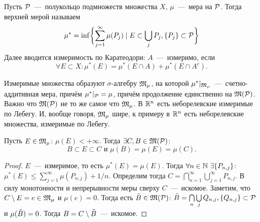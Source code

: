 \begin{reminder}
    Пусть $\mathcal{P}$~---~полукольцо подмножеств множества $X$, $\mu$~---~мера на $\mathcal{P}$. Тогда верхней мерой называем \[\mu^* = \inf \biggl\{\sum\limits_{j = 1}^\infty \mu(P_j) \mid E \subset \bigcup\limits_j P_j, \{P_j\} \subset \mathcal{P}\biggr\}\]
    Далее вводится измеримость по Каратеодори: $A$~---~измеримо, если \[\forall E \subset X: \mu^*(E) = \mu^*(E \cap A) + \mu^*(E \cap A^c).\]

    Измеримые множества образуют $\sigma$-алгебру $\mathfrak{M}_{\mu}$, на которой $\mu^* |_{\mathfrak{M}_{\mu}}$~---~счетно-аддитивная мера, причём $\mu^*|_{\mathcal{P}} = \mu$, причём продолжение единственно на $\mathfrak{M}(\mathcal{P})$. Важно что $\mathfrak{M}(\mathcal{P})$ не то же самое что  $\mathfrak{M}_{\mu}$. В $\mathbb{R}^n$ есть неборелевские измеримые по Лебегу. И, вообще говоря, $\mathfrak{M}_{\mu}$ шире, к примеру в $\mathbb{R}^n$ есть неборелевские множества, измеримые по Лебегу.
\end{reminder}
\begin{lemma}
    Пусть $E \in \mathfrak{M}_\mu$: $\mu (E) < +\infty$. Тогда $\exists C, B \in \mathfrak{M}(\mathcal{P})$: $$B \subset E \subset C \text{  и  } \mu(B) = \mu(E) = \mu(C).$$
\end{lemma}
\begin{proof}
    $E$~---~измеримое, то есть $\mu^*(E) = \mu(E)$.
    Тогда $\forall n \in \mathbb{N} \ \exists \{P_{n, j}\}$: $\mu^*(E) \leq \sum\limits_{j = 1}^\infty \mu(P_{n, j}) + 1/n$. Определим тогда $C = \bigcap\limits_{n = 1}^\infty\bigcup\limits_{j = 1}^\infty P_{n, j}$. В силу монотонности и непрерывности меры сверху $C$~---~искомое. Заметим, что $C \setminus E = e \in \mathfrak{M}_\mu$ и $\mu(e) = 0$. Тогда есть $\Tilde{B} \in \mathfrak{M}(\mathcal{P})$: $\Tilde{B} = \bigcap\limits_n\bigcup\limits_j Q_{n, j}, \{Q_{n, j}\} \subset \mathcal{P}$ и $\mu(\Tilde{B}) = 0$. Тогда $B = C \setminus \Tilde{B}$~---~искомое.
\end{proof}
